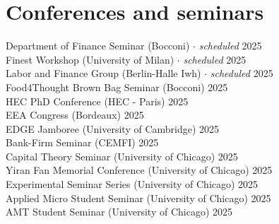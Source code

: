 \documentclass[A4,11pt]{article}
\begin{document}
\section{Conferences and seminars}
\hspace{12pt} Department of Finance Seminar (Bocconi) \hspace{0.3em} $\cdot$ \hspace{0.3em} \textit{scheduled}  \hfill 2025\\
\smallskip
\hspace{12pt} Finest Workshop (University of Milan) \hspace{0.3em} $\cdot$ \hspace{0.3em} \textit{scheduled} \hfill 2025\\
\smallskip
\hspace{12pt} Labor and Finance Group (Berlin-Halle Iwh) \hspace{0.3em} $\cdot$ \hspace{0.3em} \textit{scheduled} \hfill 2025\\
\smallskip
\hspace{12pt} Food4Thought Brown Bag Seminar (Bocconi) \hfill 2025\\
\smallskip
\hspace{12pt} HEC PhD Conference (HEC - Paris) \hfill 2025\\
\smallskip
\hspace{12pt} EEA Congress (Bordeaux) \hfill 2025\\
\smallskip
\hspace{12pt} EDGE Jamboree (University of Cambridge) \hfill 2025\\
\smallskip
\hspace{12pt} Bank-Firm Seminar (CEMFI) \hfill 2025\\
\smallskip
\hspace{12pt} Capital Theory Seminar (University of Chicago) \hfill 2025\\
\smallskip
\hspace{12pt} Yiran Fan Memorial Conference (University of Chicago) \hfill 2025\\
\smallskip
\hspace{12pt} Experimental Seminar Series (University of Chicago) \hfill 2025\\
\smallskip
\hspace{12pt} Applied Micro Student Seminar (University of Chicago) \hfill 2025\\
\smallskip
\hspace{12pt} AMT Student Seminar (University of Chicago) \hfill 2025\\
\end{document}
